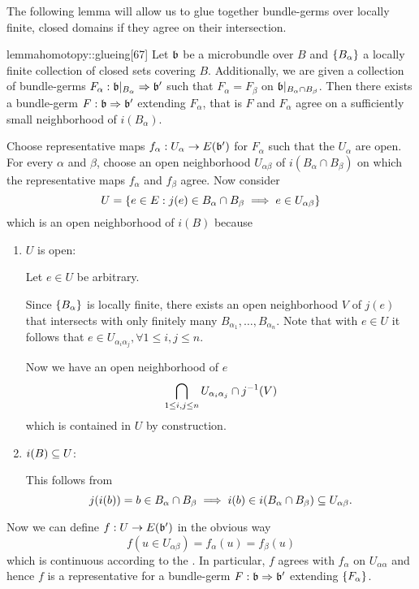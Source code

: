 \begin{myparagraph}
    The following lemma will allow us to glue
    together bundle-germs over locally finite, closed domains if they agree on their intersection.
\end{myparagraph}

\begin{mystatement}{lemma}{homotopy::glueing}[67]
    Let $\bb$ be a microbundle over $B$ and $\{B_\alpha\}$
    a locally finite collection of closed sets covering $B$.
    Additionally, we are given a collection
    of bundle-germs $\germdef{F_\alpha}{\bb[B_\alpha]}{\bb'}$
    such that $F_\alpha = F_\beta$ on $\bb[B_\alpha \cap B_\beta]$.
    Then there exists a bundle-germ $\germdef{F}{\bb}{\bb'}$ extending $F_\alpha$,
    that is $F$ and $F_\alpha$ agree on a sufficiently small neighborhood of $i(B_\alpha)$.
\end{mystatement}

\begin{myproof}
    Choose representative maps $f_\alpha: U_\alpha \to E(\bb')$ for $F_\alpha$ such that the $U_\alpha$ are open.
    For every $\alpha$ and $\beta$, choose an open neighborhood $U_{\alpha\beta}$ of $i(B_\alpha \cap B_\beta)$ on which the representative maps $f_\alpha$ and $f_\beta$ agree.
    Now consider
    \[ U = \{ e \in E:j(e) \in B_\alpha \cap B_\beta \implies e \in U_{\alpha\beta}\} \]
    which is an open neighborhood of $i(B)$ because
    \begin{enumerate}
        \item $U$ is open:

        Let $e \in U$ be arbitrary.

        Since $\{B_\alpha\}$ is locally finite,
        there exists an open neighborhood $V$ of $j(e)$
        that intersects with only finitely many $B_{\alpha_1}, \dots, B_{\alpha_n}$.
        Note that with $e \in U$ it follows that $e \in U_{\alpha_i\alpha_j}, \forall 1 \le i, j \le n$.

        Now we have an open neighborhood of $e$
        \[ \bigcap_{1 \le i, j \le n} U_{\alpha_i\alpha_j} \cap j^{-1}(V) \]
        which is contained in $U$ by construction.

        \item $i(B) \subseteq{} U$:
        
        This follows from
        \[ j(i(b)) = b \in B_\alpha \cap B_\beta \implies i(b) \in i(B_\alpha \cap B_\beta) \subseteq{} U_{\alpha\beta}. \]
    \end{enumerate}
    Now we can define $f: U \to E(\bb')$ in the obvious way
    \[ f(u \in U_{\alpha\beta}) = f_\alpha(u) = f_\beta(u) \]
    which is continuous according to the .
    In particular, $f$ agrees with $f_\alpha$ on $U_{\alpha\alpha}$
    and hence $f$ is a representative for a bundle-germ $\germdef{F}{\bb}{\bb'}$ extending $\{F_\alpha\}$.
\end{myproof}